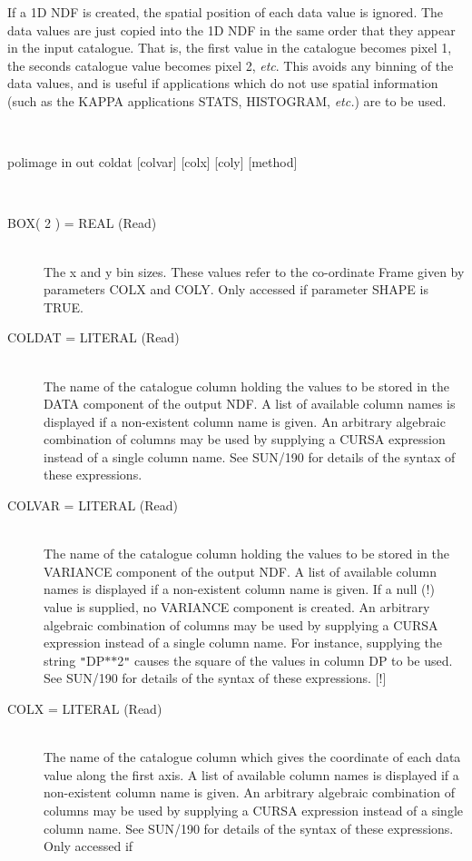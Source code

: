 \documentclass[twoside,11pt]{article}
\newcommand{\xref}[3]{#1}
\renewcommand{\_}{\texttt{\symbol{95}}}
\newcommand{\sstusage}[1]{\item[Usage:] \mbox{}
\\[1.3ex]{\raggedright \ssttt #1}}
\newcommand{\sstparameters}[1]{
   \item[Parameters:] \mbox{} \\
   \vspace{-3.5ex}
   \begin{description}
      #1
   \end{description}
}
\newcommand{\sstsubsection}[1]{ \item[{#1}] \mbox{} \\}
\newcommand{\sstusage}[1]{\item[Usage:]
      \begin{description}
         {\ssttt #1}
      \end{description}
      \\
   }
\newcommand{\sstparameters}[1]{
      \item[Parameters:] \\
      \begin{description}
         #1
      \end{description}
      \\
   }
\newcommand{\sstsubsection}[1]{\item[{#1}]}
\begin{document}
{{      If a 1D NDF is created, the spatial position of each data value is
      ignored. The data values are just copied into the 1D NDF in the
      same order that they appear in the input catalogue. That is, the
      first value in the catalogue becomes pixel 1, the seconds catalogue
      value becomes pixel 2, \emph{etc}. This avoids any binning of the data
      values, and is useful if applications which do not use spatial
      information (such as the KAPPA applications STATS, HISTOGRAM, \emph{etc.})
      are to be used.
   }
   \sstusage{
      polimage in out coldat [colvar] [colx] [coly] [method]
   }
   \sstparameters{
      \sstsubsection{
         BOX( 2 ) = \_REAL (Read)
      }{
         The x and y bin sizes. These values refer to the co-ordinate Frame
         given by parameters COLX and COLY. Only accessed if parameter SHAPE
         is TRUE.
      }
      \sstsubsection{
         COLDAT = LITERAL (Read)
      }{
         The name of the catalogue column holding the values to be stored
         in the DATA component of the output NDF. A list of available
         column names is displayed if a non-existent column name is given.
         An arbitrary algebraic combination of columns may be used by
         supplying a CURSA expression instead of a single column name. See
         \xref{SUN/190}{sun190}{} for details of the syntax of these expressions.
      }
      \sstsubsection{
         COLVAR = LITERAL (Read)
      }{
         The name of the catalogue column holding the values to be stored
         in the VARIANCE component of the output NDF. A list of available
         column names is displayed if a non-existent column name is given.
         If a null (!) value is supplied, no VARIANCE component is created.
         An arbitrary algebraic combination of columns may be used by
         supplying a CURSA expression instead of a single column name.
         For instance, supplying the string {\tt "}DP$*$$*$2{\tt "} causes the square of
         the values in column DP to be used. See \xref{SUN/190}{sun190}{} for details of the
         syntax of these expressions. [!]
      }
      \sstsubsection{
         COLX = LITERAL (Read)
      }{
         The name of the catalogue column which gives the coordinate
         of each data value along the first axis. A list of available column
         names is displayed if a non-existent column name is given. An
         arbitrary algebraic combination of columns may be used by supplying
         a CURSA expression instead of a single column name. See \xref{SUN/190}{sun190}{} for
         details of the syntax of these expressions. Only accessed if
}}}
\end{document}
